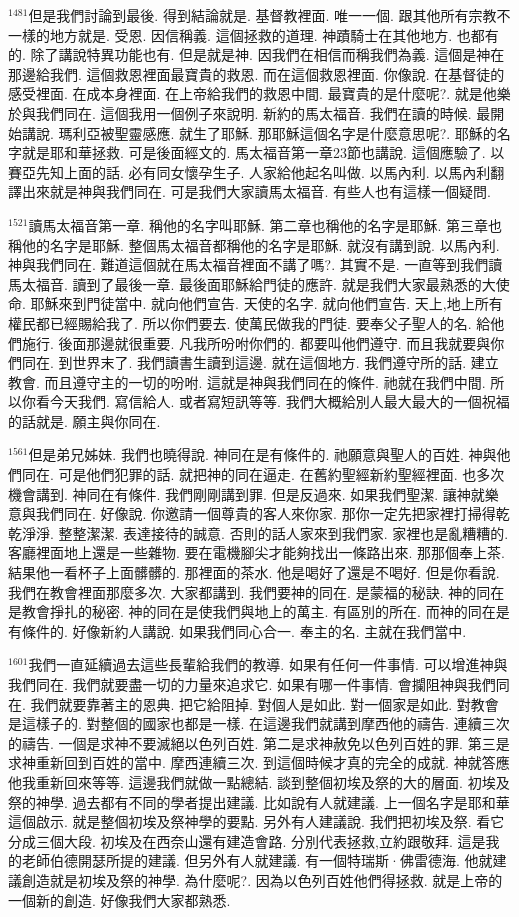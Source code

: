 \documentclass{book}
\begin{document}
$^{1481}$但是我們討論到最後.
得到結論就是.
基督教裡面.
唯一一個.
跟其他所有宗教不一樣的地方就是.
受恩.
因信稱義.
這個拯救的道理.
神蹟騎士在其他地方.
也都有的.
除了講說特異功能也有.
但是就是神.
因我們在相信而稱我們為義.
這個是神在那邊給我們.
這個救恩裡面最寶貴的救恩.
而在這個救恩裡面.
你像說.
在基督徒的感受裡面.
在成本身裡面.
在上帝給我們的救恩中間.
最寶貴的是什麼呢?.
就是他樂於與我們同在.
這個我用一個例子來說明.
新約的馬太福音.
我們在讀的時候.
最開始講說.
瑪利亞被聖靈感應.
就生了耶穌.
那耶穌這個名字是什麼意思呢?.
耶穌的名字就是耶和華拯救.
可是後面經文的.
馬太福音第一章23節也講說.
這個應驗了.
以賽亞先知上面的話.
必有同女懷孕生子.
人家給他起名叫做.
以馬內利.
以馬內利翻譯出來就是神與我們同在.
可是我們大家讀馬太福音.
有些人也有這樣一個疑問.

$^{1521}$讀馬太福音第一章.
稱他的名字叫耶穌.
第二章也稱他的名字是耶穌.
第三章也稱他的名字是耶穌.
整個馬太福音都稱他的名字是耶穌.
就沒有講到說.
以馬內利.
神與我們同在.
難道這個就在馬太福音裡面不講了嗎?.
其實不是.
一直等到我們讀馬太福音.
讀到了最後一章.
最後面耶穌給門徒的應許.
就是我們大家最熟悉的大使命.
耶穌來到門徒當中.
就向他們宣告.
天使的名字.
就向他們宣告.
天上,地上所有權民都已經賜給我了.
所以你們要去.
使萬民做我的門徒.
要奉父子聖人的名.
給他們施行.
後面那邊就很重要.
凡我所吩咐你們的.
都要叫他們遵守.
而且我就要與你們同在.
到世界末了.
我們讀書生讀到這邊.
就在這個地方.
我們遵守所的話.
建立教會.
而且遵守主的一切的吩咐.
這就是神與我們同在的條件.
祂就在我們中間.
所以你看今天我們.
寫信給人.
或者寫短訊等等.
我們大概給別人最大最大的一個祝福的話就是.
願主與你同在.

$^{1561}$但是弟兄姊妹.
我們也曉得說.
神同在是有條件的.
祂願意與聖人的百姓.
神與他們同在.
可是他們犯罪的話.
就把神的同在逼走.
在舊約聖經新約聖經裡面.
也多次機會講到.
神同在有條件.
我們剛剛講到罪.
但是反過來.
如果我們聖潔.
讓神就樂意與我們同在.
好像說.
你邀請一個尊貴的客人來你家.
那你一定先把家裡打掃得乾乾淨淨.
整整潔潔.
表達接待的誠意.
否則的話人家來到我們家.
家裡也是亂糟糟的.
客廳裡面地上還是一些雜物.
要在電機腳尖才能夠找出一條路出來.
那那個奉上茶.
結果他一看杯子上面髒髒的.
那裡面的茶水.
他是喝好了還是不喝好.
但是你看說.
我們在教會裡面那麼多次.
大家都講到.
我們要神的同在.
是蒙福的秘訣.
神的同在是教會掙扎的秘密.
神的同在是使我們與地上的萬主.
有區別的所在.
而神的同在是有條件的.
好像新約人講說.
如果我們同心合一.
奉主的名.
主就在我們當中.

$^{1601}$我們一直延續過去這些長輩給我們的教導.
如果有任何一件事情.
可以增進神與我們同在.
我們就要盡一切的力量來追求它.
如果有哪一件事情.
會攔阻神與我們同在.
我們就要靠著主的恩典.
把它給阻掉.
對個人是如此.
對一個家是如此.
對教會是這樣子的.
對整個的國家也都是一樣.
在這邊我們就講到摩西他的禱告.
連續三次的禱告.
一個是求神不要滅絕以色列百姓.
第二是求神赦免以色列百姓的罪.
第三是求神重新回到百姓的當中.
摩西連續三次.
到這個時候才真的完全的成就.
神就答應他我重新回來等等.
這邊我們就做一點總結.
談到整個初埃及祭的大的層面.
初埃及祭的神學.
過去都有不同的學者提出建議.
比如說有人就建議.
上一個名字是耶和華這個啟示.
就是整個初埃及祭神學的要點.
另外有人建議說.
我們把初埃及祭.
看它分成三個大段.
初埃及在西奈山還有建造會路.
分別代表拯救,立約跟敬拜.
這是我的老師伯德開瑟所提的建議.
但另外有人就建議.
有一個特瑞斯·佛雷德海.
他就建議創造就是初埃及祭的神學.
為什麼呢?.
因為以色列百姓他們得拯救.
就是上帝的一個新的創造.
好像我們大家都熟悉.
\end{document}
